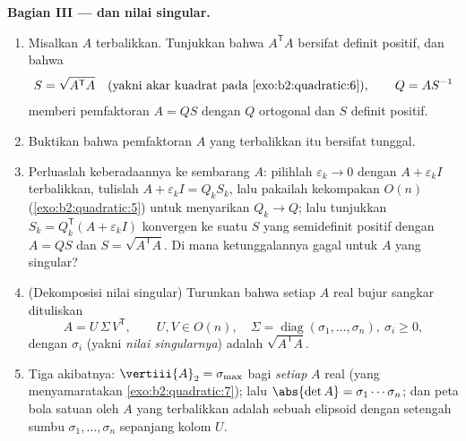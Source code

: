 \begin{problem}
\medskip
\noindent\textbf{Bagian III ---  dan nilai
singular.}
\begin{enumerate}[resume]
  \item Misalkan $A$ terbalikkan. Tunjukkan bahwa $A^{\mathsf T}A$
        bersifat definit positif, dan bahwa
        \[
        S = \sqrt{A^{\mathsf T}A}
        \quad\text{(yakni akar kuadrat pada
        \cref{exo:b2:quadratic:6})},
        \qquad Q = AS^{-1}
        \]
        memberi pemfaktoran $A = QS$ dengan $Q$ ortogonal dan
        $S$ definit positif.
  \item Buktikan bahwa pemfaktoran $A$ yang terbalikkan itu bersifat
        tunggal.
  \item Perluaslah keberadaannya ke sembarang $A$: pilihlah
        $\varepsilon_k \to 0$ dengan $A + \varepsilon_k I$
        terbalikkan, tulislah $A + \varepsilon_kI = Q_kS_k$, lalu
        pakailah kekompakan $O(n)$
        (\cref{exo:b2:quadratic:5}) untuk menyarikan $Q_k \to Q$;
        lalu tunjukkan $S_k = Q_k^{\mathsf T}(A + \varepsilon_kI)$
        konvergen ke suatu $S$ yang semidefinit positif dengan $A =
        QS$ dan $S = \sqrt{A^{\mathsf T}A}$. Di mana
        ketunggalannya gagal untuk $A$ yang singular?
  \item (Dekomposisi nilai singular) Turunkan bahwa setiap $A$
        real bujur sangkar dituliskan
        \[
        A = U\,\Sigma\,V^{\mathsf T},
        \qquad U, V \in O(n),\quad
        \Sigma = \operatorname{diag}(\sigma_1, \dots,
        \sigma_n),\ \sigma_i \geq 0 ,
        \]
        dengan $\sigma_i$ (yakni \emph{nilai singularnya}) adalah
         $\sqrt{A^{\mathsf T}A}$.
  \item Tiga akibatnya: $\vertiii{A}_2 = \sigma_{\max}$ bagi
        \emph{setiap} $A$ real (yang menyamaratakan
        \cref{exo:b2:quadratic:7}); lalu $\abs{\det A} =
        \sigma_1\cdots\sigma_n$; dan peta bola satuan
        oleh $A$ yang terbalikkan adalah sebuah elipsoid dengan
        setengah sumbu $\sigma_1, \dots, \sigma_n$ sepanjang kolom
        $U$.
\end{enumerate}


\end{problem}
